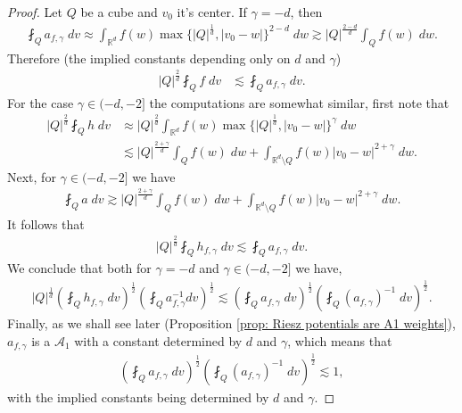 \documentclass[12pt,american]{amsart}
\numberwithin{equation}{section}
\theoremstyle{plain}
\theoremstyle{definition}                  %
\begin{document}
\begin{proof}
  Let $Q$ be a cube and $v_0$ it's center. If $\gamma=-d$, then
  \begin{align*}
    \fint_{Q}a_{f,\gamma}\;dv \approx \int_{\mathbb{R}^d}f(w)\max\{|Q|^{\frac{1}{d}},|v_0-w|\}^{2-d}\;dw \gtrsim |Q|^{\frac{2-d}{d}}\int_{Q}f(w)\;dw.
  \end{align*}
  Therefore (the implied constants depending only on $d$ and $\gamma$)
  \begin{align*}
    |Q|^{\frac{2}{d}}\fint_{Q}f\;dv & \lesssim \fint_{Q}a_{f,\gamma}\;dv.
  \end{align*}	
  For the case $\gamma \in(-d,-2]$ the computations are somewhat similar, first note that
  \begin{align*}
    |Q|^{\frac{2}{d}}\fint_{Q}h\;dv & \approx |Q|^{\frac{2}{d}}\int_{\mathbb{R}^d} f(w) \max \{|Q|^{\frac{1}{d}},|v_0-w|\}^\gamma\;dw\\
    & \lesssim |Q|^{\frac{2+\gamma}{d}}\int_{Q}f(w)\;dw+\int_{\mathbb{R}^d\setminus Q} f(w)|v_0-w|^{2+\gamma}\;dw.
  \end{align*}
  Next, for $\gamma \in (-d,-2]$ we have
  \begin{align*}
    \fint_{Q} a\;dv \gtrsim |Q|^{\frac{2+\gamma}{d}}\int_{Q}f(w)\;dw+\int_{\mathbb{R}^d\setminus Q} f(w)|v_0-w|^{2+\gamma}\;dw.	
  \end{align*}	
  It follows that
  \begin{align*}
    |Q|^{\frac{2}{d}} \fint_{Q}h_{f,\gamma}\;dv  \lesssim \fint_{Q}a_{f,\gamma}\;dv.	
  \end{align*}
  We conclude that both for $\gamma=-d$ and $\gamma\in (-d,-2]$ we have,
  \begin{align*}
    |Q|^{\frac{1}{d}}\left ( \fint_{Q}h_{f,\gamma}\;dv \right )^{\frac{1}{2}}\left ( \fint_{Q} a_{f,\gamma}^{-1} dv\right )^{\frac{1}{2}}  \lesssim \left ( \fint_{Q}a_{f,\gamma}\;dv\right )^{\frac{1}{2}}\left (  \fint_{Q}(a_{f,\gamma})^{-1}\;dv \right )^{\frac{1}{2}}. 
  \end{align*}
  Finally, as we shall see later (Proposition \ref{prop: Riesz potentials are A1 weights}), $a_{f,\gamma}$ is a $\mathcal{A}_1$ with a constant determined by $d$ and $\gamma$, which means that
  \begin{align*}
    \left ( \fint_{Q}a_{f,\gamma}\;dv\right )^{\frac{1}{2}}\left (  \fint_{Q}(a_{f,\gamma})^{-1}\;dv \right )^{\frac{1}{2}} \lesssim 1,
  \end{align*}
  with the implied constants being determined by $d$ and $\gamma$.	
\end{proof}
   
\end{document}
